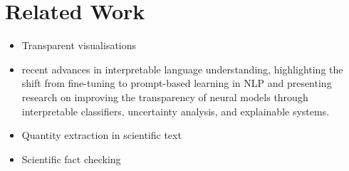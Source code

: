 \section{Related Work}
\label{sec:related}


\begin{itemize}
    \item Transparent visualisations \cite{perera22,bond25,psallidas18smoke}
    \item recent advances in interpretable language understanding, highlighting the shift from fine-tuning to prompt-based learning in NLP and presenting research on improving the transparency of neural models through interpretable classifiers, uncertainty analysis, and explainable systems. \cite{Yulan_2023}
    \item Quantity extraction in scientific text \cite{bolucu-etal-2023-investigating}
    \item Scientific fact checking \cite{abu-ahmad-etal-2025-climatecheck-shared}

\end{itemize}



